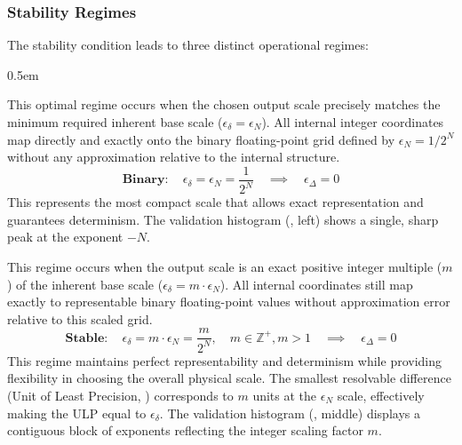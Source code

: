 \documentclass[10pt]{article}
\begin{document}
\subsubsection{Stability Regimes}\label{subsubsec:stability-regimes}
The stability condition leads to three distinct operational regimes:

\begin{description} \itemsep0.5em
    \item[Binary Scaling ($\epsilon_\Delta = 0$ with $m=1$):] This optimal regime occurs when the chosen output scale precisely matches the minimum required inherent base scale ($\epsilon_\delta = \epsilon_N$). All internal integer coordinates map directly and exactly onto the binary floating-point grid defined by $\epsilon_N = 1/2^N$ without any approximation relative to the internal structure.
    \begin{equation}\label{eq:scaling-binary}
    \textbf{Binary}: \quad \epsilon_\delta = \epsilon_N = \frac{1}{2^N} \quad \implies \quad \epsilon_\Delta = 0
    \end{equation}
    This represents the most compact scale that allows exact representation and guarantees determinism. The validation histogram (, left) shows a single, sharp peak at the exponent $-N$.

    \item[Stable Scaling ($\epsilon_\Delta = 0$ with $m > 1$):] This regime occurs when the output scale is an exact positive integer multiple ($m$) of the inherent base scale ($\epsilon_\delta = m \cdot \epsilon_N$). All internal coordinates still map exactly to representable binary floating-point values without approximation error relative to this scaled grid.
    \begin{equation}\label{eq:scaling-stable}
    \textbf{Stable}: \quad \epsilon_\delta = m \cdot \epsilon_N = \frac{m}{2^N}, \quad m \in \mathbb{Z}^+, m > 1 \quad \implies \quad \epsilon_\Delta = 0
    \end{equation}
    This regime maintains perfect representability and determinism while providing flexibility in choosing the overall physical scale. The smallest resolvable difference (Unit of Least Precision, ) corresponds to $m$ units at the $\epsilon_N$ scale, effectively making the ULP equal to $\epsilon_\delta$. The validation histogram (, middle) displays a contiguous block of exponents reflecting the integer scaling factor $m$.


\end{description}
\end{document}
